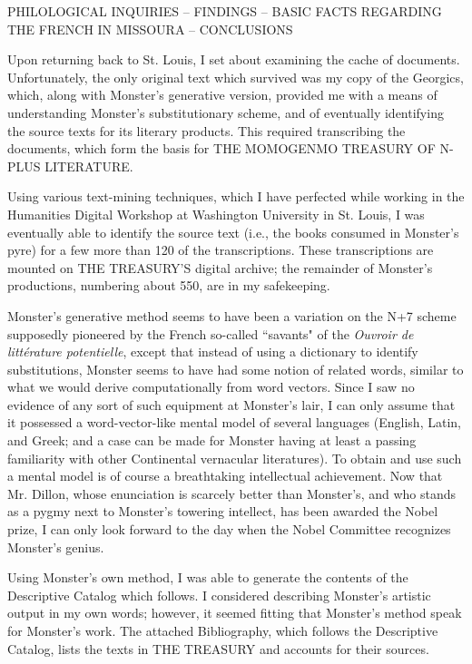 \newpage
\par
\begin{center}
PHILOLOGICAL INQUIRIES – FINDINGS – BASIC FACTS REGARDING THE FRENCH IN MISSOURA – CONCLUSIONS
\end{center}
\par
Upon returning back to St. Louis, I set about examining the cache of documents.  Unfortunately, the only original text which survived was my copy of the Georgics, which, along with Monster's generative version, provided me with a means of understanding Monster's substitutionary scheme, and of eventually identifying the source texts for its literary products.  This required transcribing the documents, which form the basis for THE MOMOGENMO TREASURY OF N-PLUS LITERATURE.
\par
Using various text-mining techniques, which I have perfected while working in the Humanities Digital Workshop at Washington University in St. Louis, I was eventually able to identify the source text (i.e., the books consumed in Monster's pyre) for a few more than 120 of the transcriptions.  These transcriptions are mounted on THE TREASURY'S digital archive; the remainder of Monster's productions, numbering about 550, are in my safekeeping.
\par
Monster's generative method seems to have been a variation on the N+7 scheme supposedly pioneered by the French so-called ``savants" of the \textit{Ouvroir de littérature potentielle}, except that instead of using a dictionary to identify substitutions, Monster seems to have had some notion of related words, similar to what we would derive computationally from word vectors.  Since I saw no evidence of any sort of such equipment at Monster's lair, I can only assume that it possessed a word-vector-like mental model of several languages (English, Latin, and Greek; and a case can be made for Monster having at least a passing familiarity with other Continental vernacular literatures).  To obtain and use such a mental model is of course a breathtaking intellectual achievement.  Now that Mr. Dillon, whose enunciation is scarcely better than Monster's, and who stands as a pygmy next to Monster's towering intellect, has been awarded the Nobel prize, I can only look forward to the day when the Nobel Committee recognizes Monster's genius.
\par
Using Monster's own method, I was able to generate the contents of the Descriptive Catalog which follows.  I considered describing Monster's artistic output in my own words; however, it seemed fitting that Monster's method speak for Monster's work.  The attached Bibliography, which follows the Descriptive Catalog, lists the texts in THE TREASURY and accounts for their sources.
